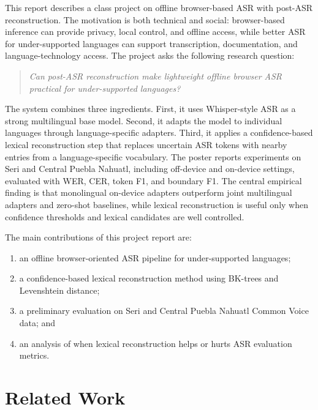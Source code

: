 \documentclass[11pt]{article}
\begin{document}
This report describes a class project on offline browser-based ASR with post-ASR reconstruction. The motivation is both technical and social: browser-based inference can provide privacy, local control, and offline access, while better ASR for under-supported languages can support transcription, documentation, and language-technology access. The project asks the following research question:

\begin{quote}
\emph{Can post-ASR reconstruction make lightweight offline browser ASR practical for under-supported languages?}
\end{quote}

The system combines three ingredients. First, it uses Whisper-style ASR as a strong multilingual base model. Second, it adapts the model to individual languages through language-specific adapters. Third, it applies a confidence-based lexical reconstruction step that replaces uncertain ASR tokens with nearby entries from a language-specific vocabulary. The poster reports experiments on Seri and Central Puebla Nahuatl, including off-device and on-device settings, evaluated with WER, CER, token F1, and boundary F1. The central empirical finding is that monolingual on-device adapters outperform joint multilingual adapters and zero-shot baselines, while lexical reconstruction is useful only when confidence thresholds and lexical candidates are well controlled.

The main contributions of this project report are:
\begin{enumerate}[leftmargin=*,noitemsep]
    \item an offline browser-oriented ASR pipeline for under-supported languages;
    \item a confidence-based lexical reconstruction method using BK-trees and Levenshtein distance;
    \item a preliminary evaluation on Seri and Central Puebla Nahuatl Common Voice data; and
    \item an analysis of when lexical reconstruction helps or hurts ASR evaluation metrics.
\end{enumerate}

\section{Related Work}
\end{document}
